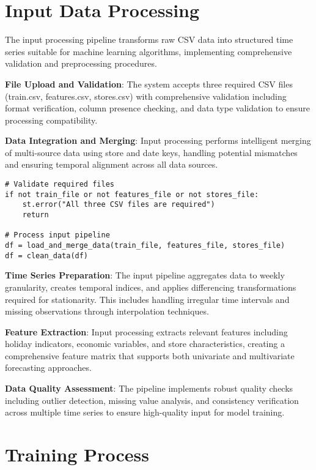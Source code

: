 \section{Input Data Processing}

The input processing pipeline transforms raw CSV data into structured time series suitable for machine learning algorithms, implementing comprehensive validation and preprocessing procedures.

\textbf{File Upload and Validation}: The system accepts three required CSV files (train.csv, features.csv, stores.csv) with comprehensive validation including format verification, column presence checking, and data type validation to ensure processing compatibility.

\textbf{Data Integration and Merging}: Input processing performs intelligent merging of multi-source data using store and date keys, handling potential mismatches and ensuring temporal alignment across all data sources.

\begin{lstlisting}[style=bashstyle, caption={Input Data Validation and Processing}]
# Validate required files
if not train_file or not features_file or not stores_file:
    st.error("All three CSV files are required")
    return

# Process input pipeline
df = load_and_merge_data(train_file, features_file, stores_file)
df = clean_data(df)
\end{lstlisting}

\textbf{Time Series Preparation}: The input pipeline aggregates data to weekly granularity, creates temporal indices, and applies differencing transformations required for stationarity. This includes handling irregular time intervals and missing observations through interpolation techniques.

\textbf{Feature Extraction}: Input processing extracts relevant features including holiday indicators, economic variables, and store characteristics, creating a comprehensive feature matrix that supports both univariate and multivariate forecasting approaches.

\textbf{Data Quality Assessment}: The pipeline implements robust quality checks including outlier detection, missing value analysis, and consistency verification across multiple time series to ensure high-quality input for model training.

\section{Training Process}


